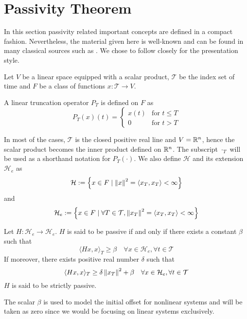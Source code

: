 \section{Passivity Theorem}
In this section passivity related important concepts are defined in a compact fashion. Nevertheless, the material given here 
is well-known and can be found in many classical sources such as \cite{hillmoylan77,desvid,vdschaftbook}. We chose to 
follow \cite{desvid} closely for the presentation style. 

Let $V$ be a linear space equipped with a scalar product, $\mathcal{T}$ be the index set of time and $F$ be a class of functions 
$x:\mathcal{T}\to V$.
\begin{define} A linear truncation operator $P_T$ is defined on $F$ as 
\begin{equation}
P_T(x)(t) = \begin{cases} x(t) &\text{for } t\leq T\\ 0 &\text{for } t>T\end{cases}
\label{eq:apdx:trunc}
\end{equation}
\end{define}

In most of the cases, $\mathcal{T}$ is the closed positive real line and $V=\mathbb{R}^n$, hence the scalar product becomes the inner product 
defined on $\mathbb{R}^n$. The subscript ${\cdot}_T$ will be used as a shorthand notation for $P_T(\cdot)$. We also define $\mathcal{H}$ 
and its extension $\mathcal{H}_e$ as 
\[
\mathcal{H} := \left\{ x\in F\mid \displaystyle \left\| x \right\|^2=\langle x_T,x_T \rangle<\infty \right\}
\]
and
\[
\mathcal{H}_e := \left\{ x\in F\mid \forall T\in\mathcal{T}, \displaystyle \left\| x_T \right\|^2=\langle x_T,x_T \rangle<\infty \right\}
\]



\begin{define}Let $H:\mathcal{H}_e\to\mathcal{H}_e$. $H$ is said to be passive if and only if there exists a constant 
$\beta$ such that
\[
\langle Hx,x \rangle_T \geq \beta\quad \forall x\in\mathcal{H}_e,\forall t\in\mathcal{T}
\]
If moreover, there exists positive real number $\delta$ such that
\[
\langle Hx,x \rangle_T \geq \delta\displaystyle \left\| x_T \right\|^2+ \beta\quad \forall x\in\mathcal{H}_e,\forall t\in\mathcal{T}
\]
$H$ is said to be strictly passive. 
\end{define}
The scalar $\beta$ is used to model the initial offset for nonlinear systems and 
will be taken as zero since we would be focusing on linear systems exclusively. 

